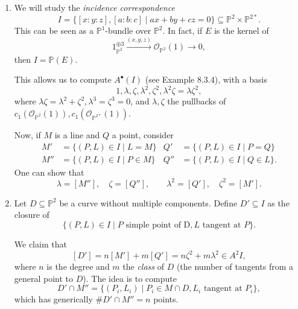 \documentclass[leqno, openany]{memoir}
\theoremstyle{definition}
\theoremstyle{remark}
\theoremstyle{plain}
\theoremstyle{definition}
\theoremstyle{remark}
\renewcommand{\P}{\mathbb{P}}
\newcommand{\mc}[1]{\mathcal{#1}}
\begin{document}
\begin{enumerate} \item We will study the \emph{incidence correspondence} \[
    I=\{[x:y:z], [a:b:c] \mid ax+by+cz=0\} \subseteq \P^2 \times \P^{2\ast}. \]
    This can be seen as a $\P^1$-bundle over $\P^2$. In fact, if $E$ is the
    kernel of \[ 1_{\P^2}^{\oplus 3} \xrightarrow{(x, y, z)} \mc{O}_{\P^2}(1)
    \to 0, \] then $I=\P(E)$. 

This allows us to compute $A^\bullet(I)$ (see Example 8.3.4), with a basis \[
1, \lambda, \zeta, \lambda^2, \zeta^2, \lambda^2\zeta=\lambda\zeta^2, \] where
$\lambda\zeta=\lambda^2+\zeta^2, \lambda^3=\zeta^3=0$, and $\lambda, \zeta$ the
pullbacks of $c_1(\mc{O}_{\P^2}(1)), c_1(\mc{O}_{\P^{2\ast}}(1))$. 

Now, if $M$ is a line and $Q$ a point, consider \begin{align*} M' &= \{(P, L)
\in I \mid L=M\} & Q' &= \{(P, L) \in I \mid P=Q\} \\ M'' &= \{(P, L) \in I
\mid P \in M\} & Q'' &= \{(P, L) \in I \mid Q \in L\}.  \end{align*} One can
show that \[ \lambda=[M''], \quad \zeta = [Q''], \qquad \lambda^2=[Q'], \quad
    \zeta^2 = [M']. \] \item Let $D \subseteq \P^2$ be a curve without multiple
    components. Define $D' \subseteq I$ as the closure of \[ \{(P, L) \in I
    \mid P \text{ simple point of D}, L \text{ tangent at }P\}. \]

We claim that \[ [D'] = n[M']+m[Q'] = n\zeta^2+m \lambda^2 \in A^2I, \] where
$n$ is the degree and $m$ the \emph{class} of $D$ (the number of tangents from
a general point to $D$). The idea is to compute \[ D' \cap M'' = \{(P_i, L_i)
\mid P_i \in M \cap D, L_i \text{ tangent at }P_i\}, \] which has generically
$\# D' \cap M''=n$ points.  


\end{enumerate}
\end{document}
